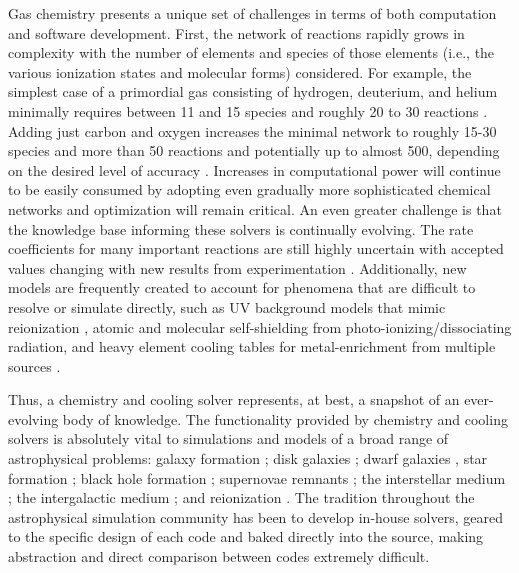 \documentclass[11pt]{article}
\begin{document}
\begin{flushleft}
Gas chemistry presents a unique set of challenges in terms of
both computation and software development.  First, the network of
reactions rapidly grows in complexity with the number of elements and
species of those elements (i.e., the various ionization states and
molecular forms) considered.  For example, the simplest case of a
primordial gas consisting of hydrogen, deuterium, and helium minimally
requires between 11 and 15 species and roughly 20 to 30 reactions
\citep{1997NewA....2..181A, 1998A&A...335..403G}.
Adding just carbon and oxygen increases the minimal network to 
roughly 15-30 species and more than 50 reactions
and potentially up to almost 500, depending on the desired level of
accuracy \citep{2005ApJ...626..627O, 2012MNRAS.421..116G}.  Increases in
computational power will continue to be easily consumed by adopting
even gradually more sophisticated chemical networks and optimization
will remain critical.  An even greater challenge is that the
knowledge base
informing these solvers is continually evolving.  The rate
coefficients for many important reactions are still highly uncertain
\citep{2008MNRAS.388.1627G, 2011ApJ...726...55T} with accepted values
changing with new results from experimentation
\citep{2010Sci...329...69K, 2015ApJS..219....6O, 2016ApJ...816...31D}.
Additionally, new models are frequently created to account for
phenomena that are difficult to resolve or simulate directly, such as
UV background models that mimic reionization
\citep[e.g.,][]{1996ApJ...461...20H, 2001cghr.confE..64H,
2012ApJ...746..125H, 2009ApJ...703.1416F}, atomic
\citep{2013MNRAS.430.2427R} and molecular \citep{1996ApJ...468..269D,
2012MNRAS.425L..51W} self-shielding from photo-ionizing/dissociating
radiation, and heavy element cooling tables for metal-enrichment from
multiple sources \citep[e.g.,][]{2009MNRAS.393...99W,
2013MNRAS.433.3005D}.

Thus, a chemistry and cooling solver
represents, at best, a snapshot of an ever-evolving body of
knowledge.  The functionality provided by chemistry and cooling solvers is
absolutely vital to simulations and models of a broad range of
astrophysical problems: galaxy formation \citep{2016ApJ...830L..13M,
2016MNRAS.462.3265D, 2017MNRAS.465.2540P, 2017MNRAS.466..105A,
2017MNRAS.tmp..110D}; disk galaxies \citep{2015MNRAS.449.2588P,
2015ApJ...814..131G}; dwarf galaxies \citep{2017arXiv170108779H}, 
star formation \citep{2016Natur.535..523F, 2017ApJ...835..137W};
black hole formation \citep{2016MNRAS.459.3217L, 2016MNRAS.459.4209A,
2016MNRAS.459.3377R, 2016MNRAS.461..111R}; supernovae remnants
\citep{2012ApJ...748...12S, 2016arXiv161008528B, 2017MNRAS.465.2471G};
the interstellar medium \citep{2015ApJ...814....4L,
2016arXiv161201786K}; the intergalactic medium
\citep{2011ApJ...731....6S, 2011MNRAS.413..190T, 2012MNRAS.420..829O};
and reionization \citep{2014ApJ...789L..32K, 2015ApJ...811....3S}.
The tradition throughout the astrophysical simulation community has
been to develop in-house solvers, geared to the specific design of
each code and baked directly into the source, making abstraction and
direct comparison between codes extremely difficult.


\end{flushleft}
\end{document}
